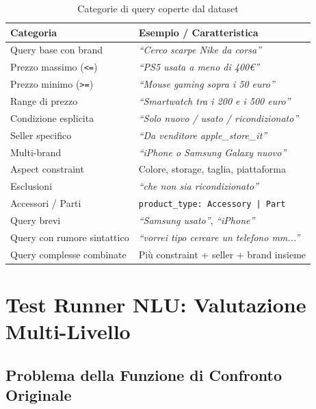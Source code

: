\begin{table}[htbp]
\centering
\caption{Categorie di query coperte dal dataset}
\label{tab:dataset-coverage}
\begin{tabular}{lp{7cm}}
\toprule
\textbf{Categoria} & \textbf{Esempio / Caratteristica} \\
\midrule
Query base con brand     & \textit{``Cerco scarpe Nike da corsa''} \\
Prezzo massimo (\texttt{<=})   & \textit{``PS5 usata a meno di 400€''} \\
Prezzo minimo (\texttt{>=})    & \textit{``Mouse gaming sopra i 50 euro''} \\
Range di prezzo          & \textit{``Smartwatch tra i 200 e i 500 euro''} \\
Condizione esplicita     & \textit{``Solo nuovo / usato / ricondizionato''} \\
Seller specifico         & \textit{``Da venditore apple\_store\_it''} \\
Multi-brand              & \textit{``iPhone o Samsung Galaxy nuovo''} \\
Aspect constraint        & Colore, storage, taglia, piattaforma \\
Esclusioni               & \textit{``che non sia ricondizionato''} \\
Accessori / Parti        & \texttt{product\_type: Accessory | Part} \\
Query brevi              & \textit{``Samsung usato''}, \textit{``iPhone''} \\
Query con rumore sintattico & \textit{``vorrei tipo cercare un telefono mm...''} \\
Query complesse combinate & Più constraint + seller + brand insieme \\
\bottomrule
\end{tabular}
\end{table}

\section{Test Runner NLU: Valutazione Multi-Livello}
\label{sec:eval-nlu-runner}

\subsection{Problema della Funzione di Confronto Originale}
\label{subsec:f1-original}

